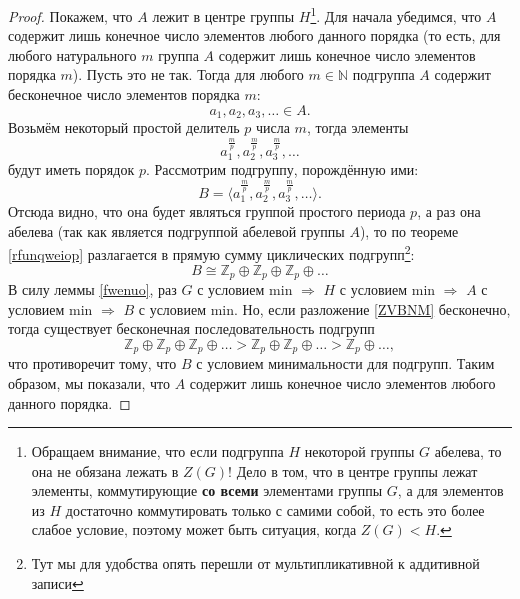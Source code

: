 \documentclass{article}
\begin{document}
\begin{proof}
    Покажем, что $A$ лежит в центре группы $H$\footnote{Обращаем внимание, что если подгруппа $H$ некоторой группы $G$ абелева, то она не обязана лежать в $Z(G)$! Дело в том, что в центре группы лежат элементы, коммутирующие \textbf{со всеми} элементами группы $G$, а для элементов из $H$ достаточно коммутировать только с самими собой, то есть это более слабое условие, поэтому может быть ситуация, когда $Z(G) < H$.}.
    Для начала убедимся, что $A$ содержит лишь конечное число элементов любого данного порядка (то есть, для любого натурального $m$ группа $A$ содержит лишь конечное число элементов порядка $m$). Пусть это не так. Тогда для любого $m \in \mathbb{N}$ подгруппа $A$ содержит бесконечное число элементов порядка $m$: $$ a_1, a_2, a_3, \ldots \in A.$$ Возьмём некоторый простой делитель $p$ числа $m$, тогда элементы
    \[
        a_1^{\frac{m}{p}}, a_2^{\frac{m}{p}}, a_3^{\frac{m}{p}}, \ldots
    \]
    будут иметь порядок $p$. Рассмотрим подгруппу, порождённую ими:
    \[
        B = \langle a_1^{\frac{m}{p}}, a_2^{\frac{m}{p}}, a_3^{\frac{m}{p}}, \ldots \rangle.
    \]
    Отсюда видно, что она будет являться группой простого периода $p$, а раз она абелева (так как является подгруппой абелевой группы $A$), то по теореме \ref{rfunqweiop} разлагается в прямую сумму циклических подгрупп\footnote{Тут мы для удобства опять перешли от мультипликативной к аддитивной записи}:
    \begin{equation} \tag{**} \label{ZVBNM}
        B \cong \mathbb{Z}_p \oplus \mathbb{Z}_p \oplus \mathbb{Z}_p \oplus \ldots
    \end{equation}
    В силу леммы \ref{fwenuo}, раз $G$ с условием min $\Rightarrow$ $H$ с условием min $\Rightarrow$ $A$ с условием min $\Rightarrow$ $B$ с условием min.
    Но, если разложение \eqref{ZVBNM} бесконечно, тогда существует бесконечная последовательность подгрупп
    \[
        \mathbb{Z}_p \oplus \mathbb{Z}_p \oplus \mathbb{Z}_p \oplus \ldots > \mathbb{Z}_p \oplus \mathbb{Z}_p \oplus \ldots > \mathbb{Z}_p \oplus \ldots,
    \]
    что противоречит тому, что $B$ с условием минимальности для подгрупп. Таким образом, мы показали, что $A$ содержит лишь конечное число элементов любого данного порядка.


\end{proof}
\end{document}
